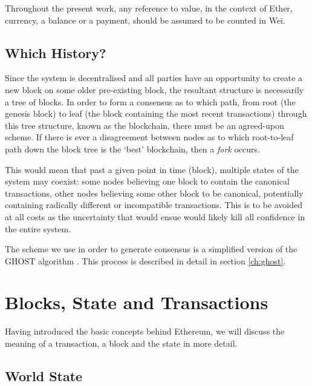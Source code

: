 \documentclass[9pt,oneside]{amsart}
\begin{document}
\begin{multicols}{2}
Throughout the present work, any reference to value, in the context of Ether, currency, a balance or a payment, should be assumed to be counted in Wei.

\subsection{Which History?}

Since the system is decentralised and all parties have an opportunity to create a new block on some older pre-existing block, the resultant structure is necessarily a tree of blocks. In order to form a consensus as to which path, from root (the genesis block) to leaf (the block containing the most recent transactions) through this tree structure, known as the blockchain, there must be an agreed-upon scheme. If there is ever a disagreement between nodes as to which root-to-leaf path down the block tree is the `best' blockchain, then a \textit{fork} occurs.

This would mean that past a given point in time (block), multiple states of the system may coexist: some nodes believing one block to contain the canonical transactions, other nodes believing some other block to be canonical, potentially containing radically different or incompatible transactions. This is to be avoided at all costs as the uncertainty that would ensue would likely kill all confidence in the entire system.

The scheme we use in order to generate consensus is a simplified version of the GHOST algorithm \cite{ghost}. This process is described in detail in section \ref{ch:ghost}.

\section{Blocks, State and Transactions} \label{ch:bst}

Having introduced the basic concepts behind Ethereum, we will discuss the meaning of a transaction, a block and the state in more detail.

\subsection{World State} \label{ch:state}


\end{multicols}
\end{document}

